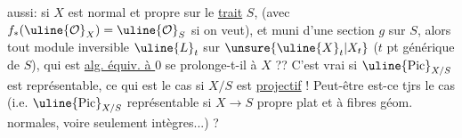 aussi: si $X$ est normal et propre sur le \uline{trait} $S$, (avec $f_*(\uline{\mathcal O}_X)=\uline{\mathcal O}_S$ si on veut), et muni d'une section $g$ sur $S$, alors tout module inversible $\uline{L}_t$ sur $\unsure{\uline{X}_t|X_t}$ ($t$ pt générique de $S$), qui est \uline{alg. équiv. à $0$} se prolonge-t-il  à $X$  ?? C'est vrai si $\uline{\mathrm{Pic}}_{X/S}$ est représentable, ce qui  est le cas si $X/S$ est \uline{projectif} ! Peut-être est-ce tjrs le cas  (i.e. $\uline{\mathrm{Pic}}_{X/S}$ représentable si $X\to S$ propre plat et à fibres géom. normales, voire seulement intègres...) ?
